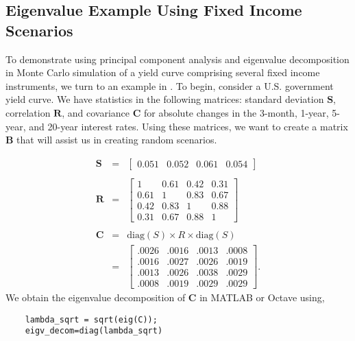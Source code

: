 
\subsection{Eigenvalue Example Using Fixed Income Scenarios}
To demonstrate using principal component analysis and eigenvalue decomposition in Monte Carlo simulation of a yield curve comprising several fixed income instruments, we turn to an example in . To begin, consider a U.S. government yield curve. We have statistics in the following matrices: standard deviation $\mathbf{S}$, correlation $\mathbf{R}$, and covariance $\mathbf{C}$ for absolute changes in the 3-month, 1-year, 5-year, and 20-year interest rates. Using these matrices, we want to create a matrix $\mathbf{B}$ that will assist us in creating random scenarios.

\begin{eqnarray*}
\mathbf{S} &=&
\begin{bmatrix}
	0.051 & 0.052 & 0.061 & 0.054
\end{bmatrix} \\
\\
\mathbf{R} &=&
\begin{bmatrix}
	1 & 0.61 & 0.42 & 0.31 \\
	0.61 & 1 & 0.83 & 0.67 \\
	0.42 & 0.83 & 1 & 0.88 \\
	0.31 & 0.67 & 0.88 & 1
\end{bmatrix} \\
\\
\mathbf{C} &=& \text{diag}(S) \times R \times \text{diag}(S)
\\
&=&
\begin{bmatrix}
	.0026 & .0016 & .0013 & .0008 \\
	.0016 & .0027 & .0026 & .0019 \\
	.0013 & .0026 & .0038 & .0029 \\
	.0008 & .0019 & .0029 & .0029
\end{bmatrix}.
\end{eqnarray*}
We obtain the eigenvalue decomposition of $\mathbf{C}$ in MATLAB or Octave using,
\begin{verbatim}
    lambda_sqrt = sqrt(eig(C));
    eigv_decom=diag(lambda_sqrt)
\end{verbatim}

